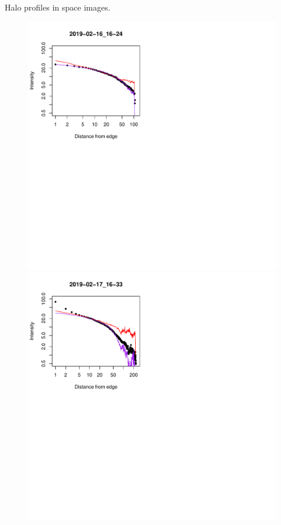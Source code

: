 \documentclass[final,hyperref={pdfpagelabels=false}]{beamer}
\begin{document}
\begin{frame}[t]
\begin{columns}[t]
\begin{column}{.23\textwidth}
\begin{block}{Halo profiles in space images.}
\begin{figure}
\centering 
\includegraphics[scale=1.08,viewport=2 261 232 496,clip]{fig/slopes_compared_2019-02-16_16-24.pdf}
\includegraphics[scale=1.08,viewport=2 261 232 496,clip]{fig/slopes_compared_2019-02-17_16-33.pdf}

\end{figure}
\end{block}
\end{column}
\end{columns}
\end{frame}
\end{document}
